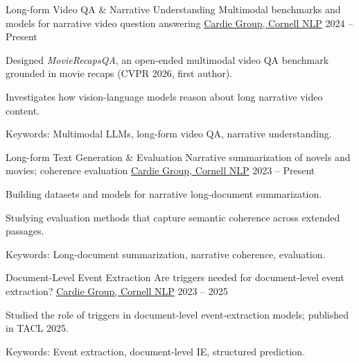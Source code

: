 
\newcommand{\cornellnlp}{\href{https://www.cs.cornell.edu/~cardie/}{Cardie Group, Cornell NLP}}
\newcommand{\qcri}{\href{https://www.hbku.edu.qa/en/qcri}{QCRI, HBKU}}

\begin{cventries}

  \cventry
    {Long-form Video QA \& Narrative Understanding}
    {Multimodal benchmarks and models for narrative video question answering}
    {\cornellnlp}
    {2024 -- Present}
    {
      \begin{cvitems}
        \item Designed \textit{MovieRecapsQA}, an open-ended multimodal video QA benchmark grounded in movie recaps (CVPR 2026, first author).
        \item Investigates how vision-language models reason about long narrative video content.
        \item Keywords: Multimodal LLMs, long-form video QA, narrative understanding.
      \end{cvitems}
    }

  \cventry
    {Long-form Text Generation \& Evaluation}
    {Narrative summarization of novels and movies; coherence evaluation}
    {\cornellnlp}
    {2023 -- Present}
    {
      \begin{cvitems}
        \item Building datasets and models for narrative long-document summarization.
        \item Studying evaluation methods that capture semantic coherence across extended passages.
        \item Keywords: Long-document summarization, narrative coherence, evaluation.
      \end{cvitems}
    }

  \cventry
    {Document-Level Event Extraction}
    {Are triggers needed for document-level event extraction?}
    {\cornellnlp}
    {2023 -- 2025}
    {
      \begin{cvitems}
        \item Studied the role of triggers in document-level event-extraction models; published in TACL 2025.
        \item Keywords: Event extraction, document-level IE, structured prediction.
      \end{cvitems}
    }


\end{cventries}
